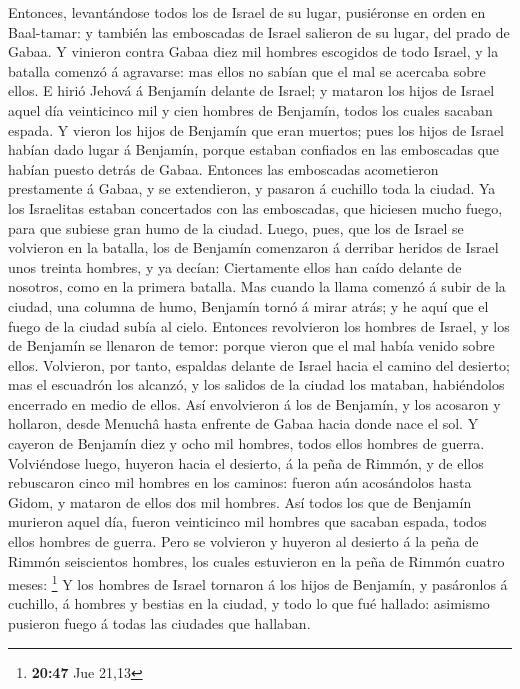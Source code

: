  Entonces, levantándose todos los de Israel de su lugar,
pusiéronse en orden en Baal-tamar: y también las emboscadas de Israel
salieron de su lugar, del prado de Gabaa.  Y vinieron
contra Gabaa diez mil hombres escogidos de todo Israel, y la batalla
comenzó á agravarse: mas ellos no sabían que el mal se acercaba sobre
ellos.  E hirió Jehová á Benjamín delante de Israel; y
mataron los hijos de Israel aquel día veinticinco mil y cien hombres de
Benjamín, todos los cuales sacaban espada.  Y vieron los
hijos de Benjamín que eran muertos; pues los hijos de Israel habían dado
lugar á Benjamín, porque estaban confiados en las emboscadas que habían
puesto detrás de Gabaa.  Entonces las emboscadas
acometieron prestamente á Gabaa, y se extendieron, y pasaron á cuchillo
toda la ciudad.  Ya los Israelitas estaban concertados
con las emboscadas, que hiciesen mucho fuego, para que subiese gran humo
de la ciudad.  Luego, pues, que los de Israel se
volvieron en la batalla, los de Benjamín comenzaron á derribar heridos
de Israel unos treinta hombres, y ya decían: Ciertamente ellos han caído
delante de nosotros, como en la primera batalla.  Mas
cuando la llama comenzó á subir de la ciudad, una columna de humo,
Benjamín tornó á mirar atrás; y he aquí que el fuego de la ciudad subía
al cielo.  Entonces revolvieron los hombres de Israel, y
los de Benjamín se llenaron de temor: porque vieron que el mal había
venido sobre ellos.  Volvieron, por tanto, espaldas
delante de Israel hacia el camino del desierto; mas el escuadrón los
alcanzó, y los salidos de la ciudad los mataban, habiéndolos encerrado
en medio de ellos.  Así envolvieron á los de Benjamín, y
los acosaron y hollaron, desde Menuchâ hasta enfrente de Gabaa hacia
donde nace el sol.  Y cayeron de Benjamín diez y ocho mil
hombres, todos ellos hombres de guerra.  Volviéndose
luego, huyeron hacia el desierto, á la peña de Rimmón, y de ellos
rebuscaron cinco mil hombres en los caminos: fueron aún acosándolos
hasta Gidom, y mataron de ellos dos mil hombres.  Así
todos los que de Benjamín murieron aquel día, fueron veinticinco mil
hombres que sacaban espada, todos ellos hombres de guerra.
 Pero se volvieron y huyeron al desierto á la peña de
Rimmón seiscientos hombres, los cuales estuvieron en la peña de Rimmón
cuatro meses: \footnote{\textbf{20:47} Jue 21,13}  Y los
hombres de Israel tornaron á los hijos de Benjamín, y pasáronlos á
cuchillo, á hombres y bestias en la ciudad, y todo lo que fué hallado:
asimismo pusieron fuego á todas las ciudades que hallaban.

